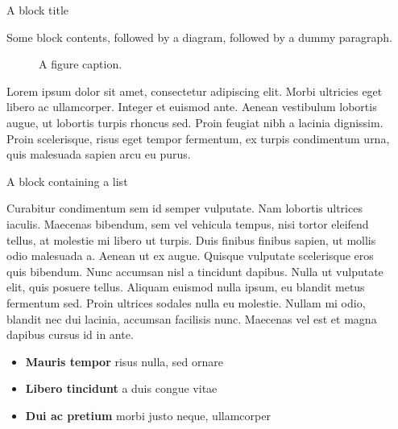 \documentclass[final]{beamer}
\newlength{\sepwidth}
\newlength{\colwidth}
\newcommand{\separatorcolumn}{\begin{column}{\sepwidth}\end{column}}
\begin{document}
\begin{frame}[t]

  \begin{columns}[t]
  \separatorcolumn
  \begin{column}{\colwidth}

  \begin{block}{A block title}

    Some block contents, followed by a diagram, followed by a dummy paragraph.

    \begin{figure}
      \centering
      \caption{A figure caption.}
    \end{figure}

    Lorem ipsum dolor sit amet, consectetur adipiscing elit. Morbi ultricies
    eget libero ac ullamcorper. Integer et euismod ante. Aenean vestibulum
    lobortis augue, ut lobortis turpis rhoncus sed. Proin feugiat nibh a
    lacinia dignissim. Proin scelerisque, risus eget tempor fermentum, ex
    turpis condimentum urna, quis malesuada sapien arcu eu purus.

  \end{block}

  \begin{block}{A block containing a list}

    Curabitur condimentum sem id semper vulputate. Nam lobortis ultrices
    iaculis. Maecenas bibendum, sem vel vehicula tempus, nisi tortor eleifend
    tellus, at molestie mi libero ut turpis. Duis finibus finibus sapien, ut
    mollis odio malesuada a. Aenean ut ex augue. Quisque vulputate scelerisque
    eros quis bibendum. Nunc accumsan nisl a tincidunt dapibus. Nulla ut
    vulputate elit, quis posuere tellus. Aliquam euismod nulla ipsum, eu
    blandit metus fermentum sed. Proin ultrices sodales nulla eu molestie.
    Nullam mi odio, blandit nec dui lacinia, accumsan facilisis nunc. Maecenas
    vel est et magna dapibus cursus id in ante.

    \begin{itemize}
      \item \textbf{Mauris tempor} risus nulla, sed ornare
      \item \textbf{Libero tincidunt} a duis congue vitae
      \item \textbf{Dui ac pretium} morbi justo neque, ullamcorper
    \end{itemize}


\end{block}
\end{column}
\end{columns}
\end{frame}
\end{document}

